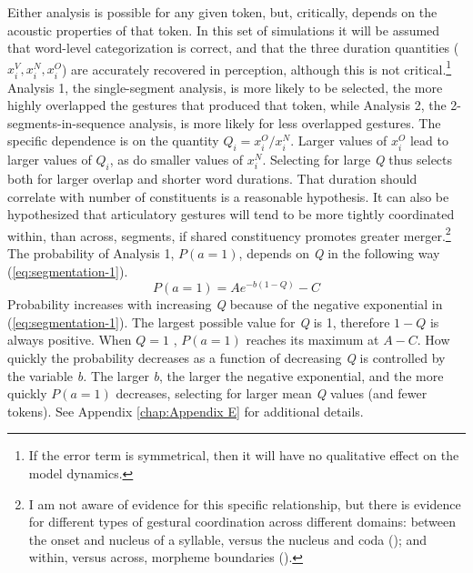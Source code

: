 Either analysis is possible for any given token, but, critically,
depends on the acoustic properties of that token. In this set of simulations
it will be assumed that word-level categorization is correct, and
that the three duration quantities ($x_{i}^{V},x_{i}^{N},x_{i}^{O}$)
are accurately recovered in perception, although this is not critical.\footnote{If the error term is symmetrical, then it will have no qualitative
effect on the model dynamics.} Analysis 1, the single-segment analysis, is more likely to be selected,
the more highly overlapped the gestures that produced that token,
while Analysis 2, the 2-segments-in-sequence analysis, is more likely
for less overlapped gestures. The specific dependence is on the quantity
$Q_{i}={x_{i}^{O}}/{x_{i}^{N}}$. Larger values of $x_{i}^{O}$
lead to larger values of $Q_{i}$, as do smaller values of $x_{i}^{N}$.
Selecting for large \emph{Q} thus selects both for larger overlap
and shorter word durations. That duration should correlate with number
of constituents is a reasonable hypothesis. It can also be hypothesized
that articulatory gestures will tend to be more tightly coordinated
within, than across, segments, if shared constituency promotes greater
merger.\footnote{I am not aware of evidence for this specific relationship, but there
is evidence for different types of gestural coordination across different
domains: between the onset and nucleus of a syllable, versus the nucleus
and coda (\citealt{Browman1988,byrd1996influences}); and within,
versus across, morpheme boundaries (\citealt{Cho2001}).} The probability of Analysis 1, $P(a=1)$, depends on \emph{Q} in
the following way (\ref{eq:segmentation-1}).
\begin{equation}
P(a=1)=Ae^{-b(1-Q)}-C\label{eq:segmentation-1}
\end{equation}
Probability increases with increasing \emph{Q} because of the negative
exponential in (\ref{eq:segmentation-1}). The largest possible value
for \emph{Q} is 1, therefore $1-Q$ is always positive. When $Q=1$
, $P(a=1)$ reaches its maximum at $A-C$. How quickly the probability
decreases as a function of decreasing \emph{Q} is controlled by the
variable \emph{b. }The larger \emph{b}, the larger the negative exponential,
and the more quickly $P(a=1)$ decreases, selecting for larger mean
\emph{Q} values (and fewer tokens). See Appendix \ref{chap:Appendix E}
for additional details.

